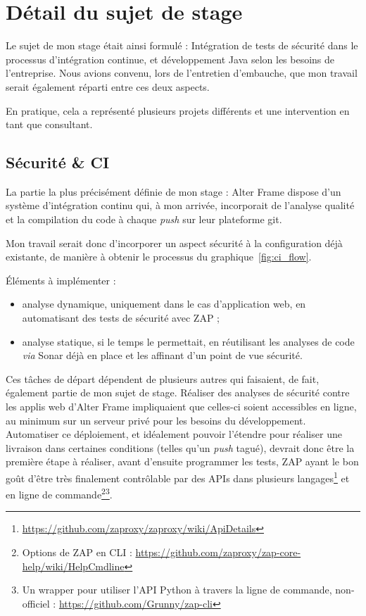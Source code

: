 \section{Détail du sujet de stage}
\label{sec:sujet}
Le sujet de mon stage était ainsi formulé : \og Intégration de tests de sécurité dans le processus d'intégration continue, et développement Java selon les besoins de l'entreprise. \fg Nous avions convenu, lors de l'entretien d'embauche, que mon travail serait également réparti entre ces deux aspects.

En pratique, cela a représenté plusieurs projets différents et une intervention en tant que consultant.

\subsection{Sécurité \& CI}
La partie la plus précisément définie de mon stage : Alter Frame dispose d'un système d'intégration continu qui, à mon arrivée, incorporait de l'analyse qualité et la compilation du code à chaque \textit{push} sur leur plateforme git.

Mon travail serait donc d'incorporer un aspect sécurité à la configuration déjà existante, de manière à obtenir le processus du graphique~\ref{fig:ci_flow}.

Éléments à implémenter :
\begin{itemize}[label=$\bullet$]
	\item analyse dynamique, uniquement dans le cas d'application web, en automatisant des tests de sécurité avec ZAP ;
	\item analyse statique, si le temps le permettait, en réutilisant les analyses de code \textit{via} Sonar déjà en place et les affinant d'un point de vue sécurité.
\end{itemize}
Ces tâches de départ dépendent de plusieurs autres qui faisaient, de fait, également partie de mon sujet de stage. Réaliser des analyses de sécurité contre les applis web d'Alter Frame impliquaient que celles-ci soient accessibles en ligne, au minimum sur un serveur privé pour les besoins du développement. Automatiser ce déploiement, et idéalement pouvoir l'étendre pour réaliser une livraison dans certaines conditions (telles qu'un \textit{push} tagué), devrait donc être la première étape à réaliser, avant d'ensuite programmer les tests, ZAP ayant le bon goût d'être très finalement contrôlable par des APIs dans plusieurs langages\footnote{\url{https://github.com/zaproxy/zaproxy/wiki/ApiDetails}} et en ligne de commande\footnote{Options de ZAP en CLI : \url{https://github.com/zaproxy/zap-core-help/wiki/HelpCmdline}}\footnote{Un wrapper pour utiliser l'API Python à travers la ligne de commande, non-officiel : \url{https://github.com/Grunny/zap-cli}}.

